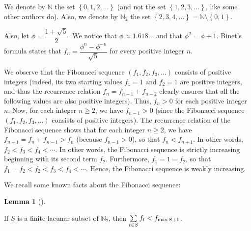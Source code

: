 \documentclass[numbers=enddot,12pt,final,onecolumn,notitlepage]{scrartcl}%
\numberwithin{exer}{section}
\theoremstyle{definition}
\newtheorem{lem}[theo]{Lemma}
\newenvironment{lemma}[1][]
{\begin{lem}[#1]\begin{leftbar}}
{\end{leftbar}\end{lem}}
\let\sumnonlimits\sum
\renewcommand{\sum}{\sumnonlimits\limits}
\begin{document}
We denote by $\mathbb{N}$ the set $\left\{  0,1,2,\ldots\right\}  $ (and not
the set $\left\{  1,2,3,\ldots\right\}  $, like some other authors do). Also,
we denote by $\mathbb{N}_{2}$ the set $\left\{  2,3,4,\ldots\right\}
=\mathbb{N}\setminus\left\{  0,1\right\}  $.

Also, let $\phi=\dfrac{1+\sqrt{5}}{2}$. We notice that $\phi\approx
1.618\ldots$ and that $\phi^{2}=\phi+1$. Binet's formula states that
$f_{n}=\dfrac{\phi^{n}-\phi^{-n}}{\sqrt{5}}$ for every positive integer $n$.

We observe that the Fibonacci sequence $\left(  f_{1},f_{2},f_{3}%
,\ldots\right)  $ consists of positive integers (indeed, its two starting
values $f_{1}=1$ and $f_{2}=1$ are positive integers, and thus the recurrence
relation $f_{n}=f_{n-1}+f_{n-2}$ clearly ensures that all the following values
are also positive integers). Thus, $f_{n} > 0$ for each positive integer $n$.
Now, for each integer $n \geq2$, we have $f_{n-1} > 0$ (since the Fibonacci
sequence $\left(  f_{1},f_{2},f_{3},\ldots\right)  $ consists of positive
integers). The recurrence relation of the Fibonacci sequence shows that for
each integer $n \geq2$, we have $f_{n+1} = f_{n} + f_{n-1} > f_{n}$ (because
$f_{n-1} > 0$), so that $f_{n} < f_{n+1}$. In other words, $f_{2} < f_{3} <
f_{4} < \cdots$. In other words, the Fibonacci sequence is strictly increasing
beginning with its second term $f_{2}$. Furthermore, $f_{1} = 1 = f_{2}$, so
that $f_{1} = f_{2} < f_{2} < f_{3} < f_{4} < \cdots$. Hence, the Fibonacci
sequence is weakly increasing.

We recall some known facts about the Fibonacci sequence:

\begin{lemma}
\label{lem.2} If $S$ is a finite lacunar subset of $\mathbb{N}_{2}$, then
$\sum\limits_{t\in S}f_{t}<f_{\max S+1}$.
\end{lemma}
\end{document}
